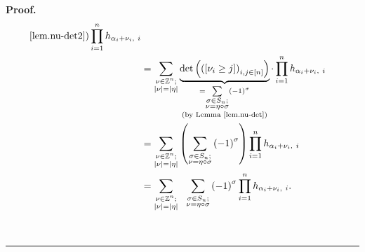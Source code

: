 \documentclass
[numbers=enddot,12pt,final,onecolumn,notitlepage,english]{scrartcl}%
\theoremstyle{definition}
\newenvironment{proof}[1][Proof]{\noindent\textbf{#1.} }{\ \rule{0.5em}{0.5em}}
\let\sumnonlimits\sum
\let\prodnonlimits\prod
\renewcommand{\sum}{\sumnonlimits\limits}
\renewcommand{\prod}{\prodnonlimits\limits}
\newenvironment{vershort}{}{}
\begin{document}
\begin{vershort}
\begin{proof}
\begin{align}
{{{\ref{lem.nu-det2})}}}\prod_{i=1}^{n}h_{\alpha_{i}+\nu_{i},\ i}\nonumber\\
&  =\sum_{\substack{\nu\in\mathbb{Z}^{n};\\\left\vert \nu\right\vert
=\left\vert \eta\right\vert }}\underbrace{\det\left(  \left(  \left[  \nu
_{i}\geq j\right]  \right)  _{i,j\in\left[  n\right]  }\right)  }%
_{\substack{=\sum_{\substack{\sigma\in S_{n};\\\nu=\eta\circ\sigma}}\left(
-1\right)  ^{\sigma}\\\text{(by Lemma \ref{lem.nu-det})}}}\cdot\prod_{i=1}%
^{n}h_{\alpha_{i}+\nu_{i},\ i}\nonumber\\
&  =\sum_{\substack{\nu\in\mathbb{Z}^{n};\\\left\vert \nu\right\vert
=\left\vert \eta\right\vert }}\left(  \sum_{\substack{\sigma\in S_{n}%
;\\\nu=\eta\circ\sigma}}\left(  -1\right)  ^{\sigma}\right)  \prod_{i=1}%
^{n}h_{\alpha_{i}+\nu_{i},\ i}\nonumber\\
&  =\sum_{\substack{\nu\in\mathbb{Z}^{n};\\\left\vert \nu\right\vert
=\left\vert \eta\right\vert }}\ \ \sum_{\substack{\sigma\in S_{n};\\\nu
=\eta\circ\sigma}}\left(  -1\right)  ^{\sigma}\prod_{i=1}^{n}h_{\alpha_{i}%
+\nu_{i},\ i}. \label{pf.thm.pre-pieri.short.2b}%
\end{align}



\end{proof}
\end{vershort}
\end{document}
